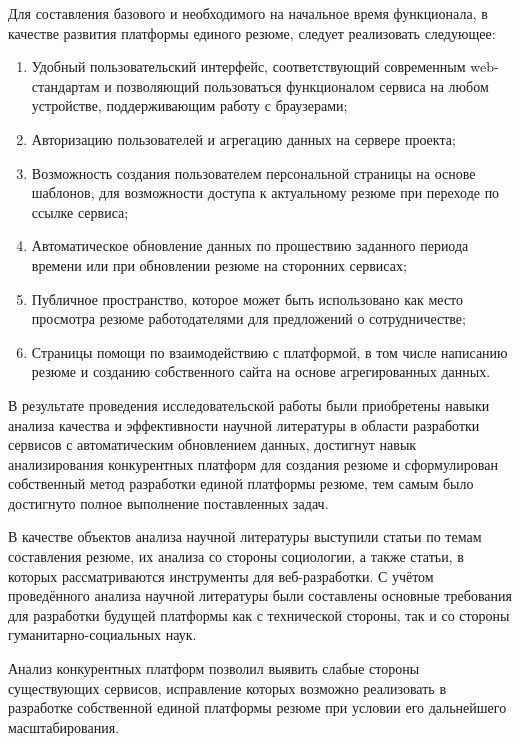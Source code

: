 \documentclass[master, och, pract]{SCWorks}
\begin{document}
Для составления базового и необходимого на начальное время функционала, в качестве развития 
платформы единого резюме, следует реализовать следующее:
\begin{enumerate}
    \item Удобный пользовательский интерфейс, соответствующий современным web-стандартам 
    и позволяющий пользоваться функционалом сервиса на любом устройстве, поддерживающим 
    работу с браузерами;
    \item Авторизацию пользователей и агрегацию данных на сервере проекта;
    \item Возможность создания пользователем персональной страницы на основе шаблонов, 
    для возможности доступа к актуальному резюме при переходе по ссылке сервиса;
    \item Автоматическое обновление данных по прошествию заданного периода времени или 
    при обновлении резюме на сторонних сервисах;
    \item Публичное пространство, которое может быть использовано как место просмотра 
    резюме работодателями для предложений о сотрудничестве;
    \item Страницы помощи по взаимодействию с платформой, в том числе написанию резюме 
    и созданию собственного сайта на основе агрегированных данных.
\end{enumerate}


\newpage
\conclusion
В результате проведения исследовательской работы были приобретены навыки анализа 
качества и эффективности научной литературы в области разработки сервисов 
с автоматическим обновлением данных, достигнут навык анализирования конкурентных 
платформ для создания резюме и сформулирован собственный метод разработки 
единой платформы резюме, тем самым было достигнуто полное выполнение поставленных задач.

В качестве объектов анализа научной литературы выступили статьи по темам составления 
резюме, их анализа со стороны социологии, а также статьи, в которых рассматриваются 
инструменты для веб-разработки. С учётом проведённого анализа научной литературы 
были составлены основные требования для разработки будущей платформы как с технической 
стороны, так и со стороны гуманитарно-социальных наук.

Анализ конкурентных платформ позволил выявить слабые стороны существующих сервисов, 
исправление которых возможно реализовать в разработке собственной единой платформы 
резюме при условии его дальнейшего масштабирования.
\end{document}
